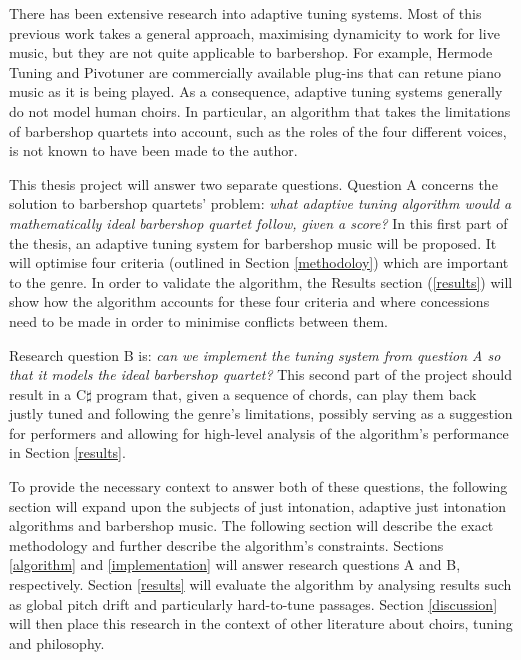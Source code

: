 \documentclass[a4paper]{article}
\begin{document}
There has been extensive research into adaptive tuning systems. \cite{sethares_adaptive_2005} Most of this previous work takes a general approach, maximising dynamicity to work for live music, but they are not quite applicable to barbershop. For example, Hermode Tuning \cite{mohrlok_hermode_2003} and Pivotuner \cite{volkov_pivotuner_2022} are commercially available plug-ins that can retune piano music as it is being played. As a consequence, adaptive tuning systems generally do not model human choirs. In particular, an algorithm that takes the limitations of barbershop quartets into account, such as the roles of the four different voices, is not known to have been made to the author.

This thesis project will answer two separate questions. Question A concerns the solution to barbershop quartets' problem: {\it what adaptive tuning algorithm would a mathematically ideal barbershop quartet follow, given a score?} In this first part of the thesis, an adaptive tuning system for barbershop music will be proposed. It will optimise four criteria (outlined in Section \ref{methodoloy}) which are important to the genre. In order to validate the algorithm, the Results section (\ref{results}) will show how the algorithm accounts for these four criteria and where concessions need to be made in order to minimise conflicts between them.

Research question B is: {\it can we implement the tuning system from question A so that it models the ideal barbershop quartet?} This second part of the project should result in a C$\sharp$ program that, given a sequence of chords, can play them back justly tuned and following the genre's limitations, possibly serving as a suggestion for performers and allowing for high-level analysis of the algorithm's performance in Section \ref{results}.

To provide the necessary context to answer both of these questions, the following section will expand upon the subjects of just intonation, adaptive just intonation algorithms and barbershop music. The following section will describe the exact methodology and further describe the algorithm's constraints. Sections \ref{algorithm} and \ref{implementation} will answer research questions A and B, respectively. Section \ref{results} will evaluate the algorithm by analysing results such as global pitch drift and particularly hard-to-tune passages. Section \ref{discussion} will then place this research in the context of other literature about choirs, tuning and philosophy.
\end{document}
